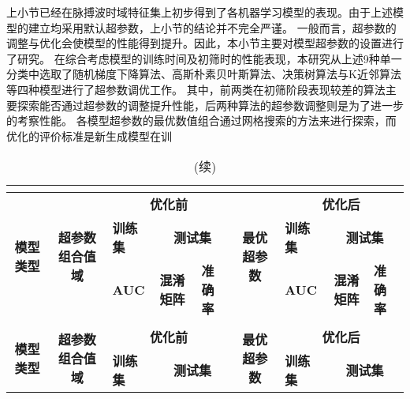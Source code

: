 上小节已经在脉搏波时域特征集上初步得到了各机器学习模型的表现。由于上述模型的建立均采用默认超参数，上小节的结论并不完全严谨。
一般而言，超参数的调整与优化会使模型的性能得到提升。因此，本小节主要对模型超参数的设置进行了研究。
在综合考虑模型的训练时间及初筛时的性能表现，本研究从上述9种单一分类中选取了随机梯度下降算法、高斯朴素贝叶斯算法、决策树算法与K近邻算法等四种模型进行了超参数调优工作。
其中，前两类在初筛阶段表现较差的算法主要探索能否通过超参数的调整提升性能，后两种算法的超参数调整则是为了进一步的考察性能。
各模型超参数的最优数值组合通过网格搜索的方法来进行探索，而优化的评价标准是新生成模型在训
\begin{landscape}
      \begin{longtable}{m{3cm}<{\centering}m{5cm}<{\centering}m{1cm}<{\centering}m{2cm}<{\centering}m{1cm}<{\centering}m{3cm}<{\centering}m{1cm}<{\centering}m{2cm}<{\centering}m{1cm}<{\centering}}
            \caption{超参数优化前后模型性能对比}\\
            \label{tab:super_para}\\
            \toprule
            \multicolumn{1}{c}{\multirow{3}{*}{\textbf{模型类型}}} & \multicolumn{1}{c}{\multirow{3}{*}{\textbf{超参数组合值域}}}    & \multicolumn{3}{c}{\textbf{优化前}}   & \multicolumn{1}{c}{\multirow{3}{*}{\textbf{最优超参数}}}   & \multicolumn{3}{c}{\textbf{优化后}} \\
            \multicolumn{1}{c}{} & \multicolumn{1}{c}{}     & \textbf{训练集} & \multicolumn{2}{c}{\textbf{测试集}} & \multicolumn{1}{c}{}   & \textbf{训练集} & \multicolumn{2}{c}{\textbf{测试集}}     \\
            \multicolumn{1}{c}{} & \multicolumn{1}{c}{}     & \textbf{AUC} & \textbf{混淆矩阵}    & \textbf{准确率} & \multicolumn{1}{c}{}    & \textbf{AUC} & \multicolumn{1}{c}{\textbf{混淆矩阵}}     & \textbf{准确率} \\
            \midrule
            \endfirsthead
            \caption[]{(续)}\\
            \midrule
            \multicolumn{1}{c}{\multirow{3}{*}{\textbf{模型类型}}} & \multicolumn{1}{c}{\multirow{3}{*}{\textbf{超参数组合值域}}}    & \multicolumn{3}{c}{\textbf{优化前}}   & \multicolumn{1}{c}{\multirow{3}{*}{\textbf{最优超参数}}}   & \multicolumn{3}{c}{\textbf{优化后}} \\
            \multicolumn{1}{c}{} & \multicolumn{1}{c}{}     & \textbf{训练集} & \multicolumn{2}{c}{\textbf{测试集}} & \multicolumn{1}{c}{}   & \textbf{训练集} & \multicolumn{2}{c}{\textbf{测试集}}     \\

\end{longtable}
\end{landscape}
